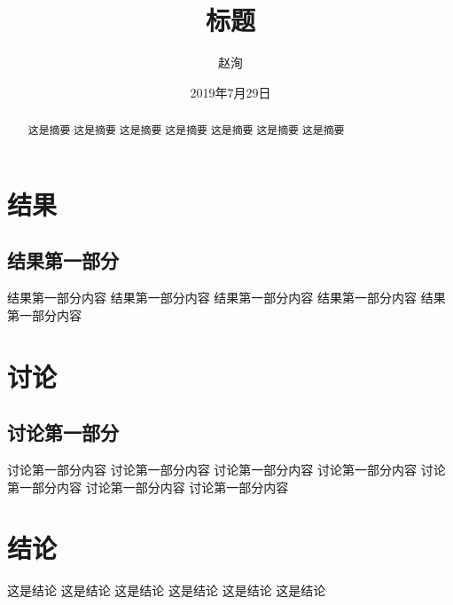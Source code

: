 \documentclass{ctexart}
\title{\bf{标题}}
\author{赵洵}
\date{2019年7月29日}
\begin{document}
    \begin{titlepage}
        \maketitle
        \setcounter{page}{0}
        \thispagestyle{empty}
    \end{titlepage}

    \renewcommand{\abstractname}{摘要}
    \begin{abstract}
            这是摘要
            这是摘要
            这是摘要
            这是摘要
            这是摘要
            这是摘要
            这是摘要
	\end{abstract}

	\section{结果}
		\subsection{结果第一部分}
            结果第一部分内容
            结果第一部分内容
            结果第一部分内容
            结果第一部分内容
            结果第一部分内容
	\section{讨论}
        \subsection{讨论第一部分}
            讨论第一部分内容
            讨论第一部分内容
            讨论第一部分内容
            讨论第一部分内容
            讨论第一部分内容
            讨论第一部分内容
            讨论第一部分内容
	\section{结论}
        这是结论
        这是结论
        这是结论
        这是结论
        这是结论
        这是结论
\end{document}
